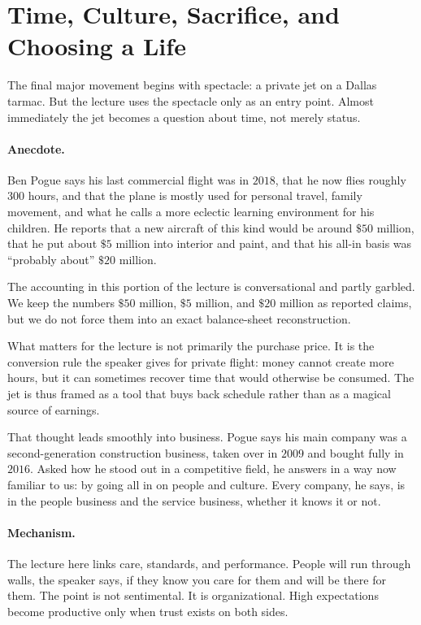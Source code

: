 \section{Time, Culture, Sacrifice, and Choosing a Life}

The final major movement begins with spectacle: a private jet on a Dallas tarmac. But the lecture uses the spectacle only as an entry point. Almost immediately the jet becomes a question about time, not merely status.

\paragraph{Anecdote.} Ben Pogue says his last commercial flight was in \(2018\), that he now flies roughly \(300\) hours, and that the plane is mostly used for personal travel, family movement, and what he calls a more eclectic learning environment for his children. He reports that a new aircraft of this kind would be around \(\$50\) million, that he put about \(\$5\) million into interior and paint, and that his all-in basis was ``probably about'' \(\$20\) million.

\begin{remark}
The accounting in this portion of the lecture is conversational and partly garbled. We keep the numbers \(\$50\) million, \(\$5\) million, and \(\$20\) million as reported claims, but we do not force them into an exact balance-sheet reconstruction.
\end{remark}

What matters for the lecture is not primarily the purchase price. It is the conversion rule the speaker gives for private flight: money cannot create more hours, but it can sometimes recover time that would otherwise be consumed. The jet is thus framed as a tool that buys back schedule rather than as a magical source of earnings.

That thought leads smoothly into business. Pogue says his main company was a second-generation construction business, taken over in \(2009\) and bought fully in \(2016\). Asked how he stood out in a competitive field, he answers in a way now familiar to us: by going all in on people and culture. Every company, he says, is in the people business and the service business, whether it knows it or not.

\paragraph{Mechanism.} The lecture here links care, standards, and performance. People will run through walls, the speaker says, if they know you care for them and will be there for them. The point is not sentimental. It is organizational. High expectations become productive only when trust exists on both sides.


